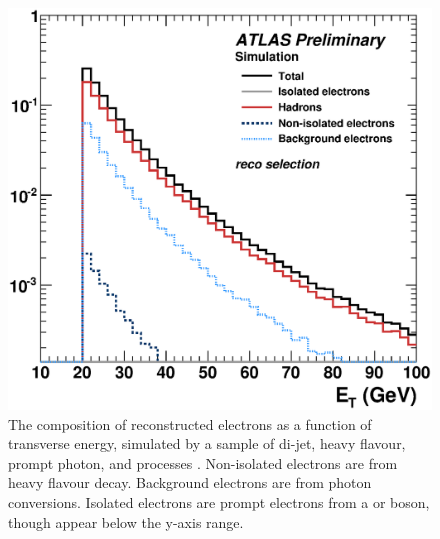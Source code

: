 \begin{figure}
	\includegraphics[width=\smallfigwidth]{tex/selection/electron_composition}
	\caption{The composition of reconstructed electrons as a function of transverse 
	energy, simulated by a  sample of di-jet, heavy flavour, prompt photon, \PW 
	and \PZ processes \cite{ElectronPerf:Expect}. Non-isolated electrons are from heavy 
	flavour decay. Background electrons are from photon conversions. Isolated electrons 
	are prompt electrons from a \PW or \PZ boson, though appear below the y-axis range.}
	\label{fig:objects:el_composition}
\end{figure}

